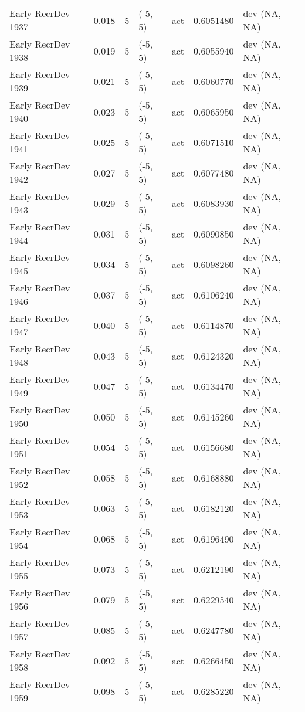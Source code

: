 \documentclass[11pt,
  english,
  a4paper,
]{article}
\begin{document}
\begin{landscape}
\begin{longtable}[t]{>{\raggedright\arraybackslash}p{6cm}lllll>{\raggedright\arraybackslash}p{4cm}}
Early RecrDev 1937 & 0.018 & 5 & (-5, 5) & act & 0.6051480 & dev (NA, NA)\\
Early RecrDev 1938 & 0.019 & 5 & (-5, 5) & act & 0.6055940 & dev (NA, NA)\\
Early RecrDev 1939 & 0.021 & 5 & (-5, 5) & act & 0.6060770 & dev (NA, NA)\\
Early RecrDev 1940 & 0.023 & 5 & (-5, 5) & act & 0.6065950 & dev (NA, NA)\\
Early RecrDev 1941 & 0.025 & 5 & (-5, 5) & act & 0.6071510 & dev (NA, NA)\\
Early RecrDev 1942 & 0.027 & 5 & (-5, 5) & act & 0.6077480 & dev (NA, NA)\\
Early RecrDev 1943 & 0.029 & 5 & (-5, 5) & act & 0.6083930 & dev (NA, NA)\\
Early RecrDev 1944 & 0.031 & 5 & (-5, 5) & act & 0.6090850 & dev (NA, NA)\\
Early RecrDev 1945 & 0.034 & 5 & (-5, 5) & act & 0.6098260 & dev (NA, NA)\\
Early RecrDev 1946 & 0.037 & 5 & (-5, 5) & act & 0.6106240 & dev (NA, NA)\\
Early RecrDev 1947 & 0.040 & 5 & (-5, 5) & act & 0.6114870 & dev (NA, NA)\\
Early RecrDev 1948 & 0.043 & 5 & (-5, 5) & act & 0.6124320 & dev (NA, NA)\\
Early RecrDev 1949 & 0.047 & 5 & (-5, 5) & act & 0.6134470 & dev (NA, NA)\\
Early RecrDev 1950 & 0.050 & 5 & (-5, 5) & act & 0.6145260 & dev (NA, NA)\\
Early RecrDev 1951 & 0.054 & 5 & (-5, 5) & act & 0.6156680 & dev (NA, NA)\\
Early RecrDev 1952 & 0.058 & 5 & (-5, 5) & act & 0.6168880 & dev (NA, NA)\\
Early RecrDev 1953 & 0.063 & 5 & (-5, 5) & act & 0.6182120 & dev (NA, NA)\\
Early RecrDev 1954 & 0.068 & 5 & (-5, 5) & act & 0.6196490 & dev (NA, NA)\\
Early RecrDev 1955 & 0.073 & 5 & (-5, 5) & act & 0.6212190 & dev (NA, NA)\\
Early RecrDev 1956 & 0.079 & 5 & (-5, 5) & act & 0.6229540 & dev (NA, NA)\\
Early RecrDev 1957 & 0.085 & 5 & (-5, 5) & act & 0.6247780 & dev (NA, NA)\\
Early RecrDev 1958 & 0.092 & 5 & (-5, 5) & act & 0.6266450 & dev (NA, NA)\\
Early RecrDev 1959 & 0.098 & 5 & (-5, 5) & act & 0.6285220 & dev (NA, NA)\\

\end{longtable}
\end{landscape}
\end{document}
